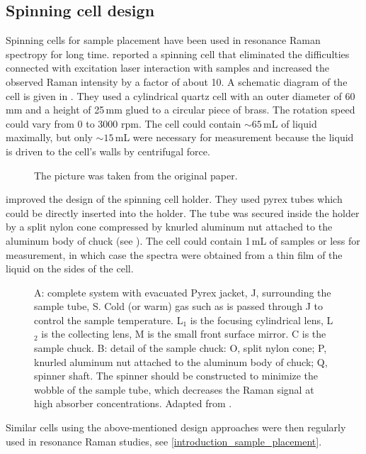 \subsection{Spinning cell design}
\label{introduction_spinning_cell}

Spinning cells for sample placement have been used in resonance Raman spectropy
for long time.
\textcite{Kiefer1971}
reported a spinning cell that eliminated the difficulties connected with
excitation laser interaction with samples and increased the observed Raman
intensity by a factor of about 10. A schematic diagram of the cell is given in
.
They used a cylindrical quartz cell with an outer diameter of 60\,mm and a
height of 25\,mm glued to a circular piece of brass.
The rotation speed could vary from 0 to 3000 rpm.
The cell could contain $\sim 65$\,mL of liquid maximally, but only
$\sim 15$\,mL were necessary for measurement because the liquid is driven to
the cell's walls by centrifugal force.

\begin{figure}
	\centering
	\caption[%
		Cell for resonance Raman measurements in liquids.%
	]{%
		The picture was taken from the original paper.
	}
	\label{\figlabel{introduction_spinning_cell:1971Kiefer_rotating_cell}}
\end{figure}

\textcite{Shriver1974} improved the design of the spinning cell holder.
They used pyrex tubes which could be directly inserted into the holder.
The tube was secured inside the holder by a split nylon cone compressed by
knurled aluminum nut attached to the aluminum body of chuck (see
).
The cell could contain 1\,mL of samples or less for measurement, in which case
the spectra were obtained from a thin film of the liquid on the sides of the
cell.

\begin{figure}
	\centering
	\caption[%
		Detail of sample spinner, for 180\textdegree{} or oblique illumination.%
	]{%
		A: complete system with evacuated Pyrex jacket, J,
			surrounding the sample tube, S.
			Cold (or warm) gas such as  is passed through J to control the
			sample temperature.
			L$_1$ is the focusing cylindrical lens,
			L$_2$ is the collecting lens,
			M is the small front surface mirror.
			C is the sample chuck.
		B: detail of the sample chuck:
			O, split nylon cone;
			P, knurled aluminum nut attached to the aluminum body of chuck;
			Q, spinner shaft.
		The spinner should be constructed to minimize the wobble of the sample
		tube, which decreases the Raman signal at high absorber concentrations.
		Adapted from \textcite{Shriver1974}.%
	}
	\label{\figlabel{introduction_spinning_cell:1974Shriver_spinning_cell}}
\end{figure}

Similar cells using the above-mentioned design approaches were then regularly
used in resonance Raman studies, see
\cref{introduction_sample_placement}.
